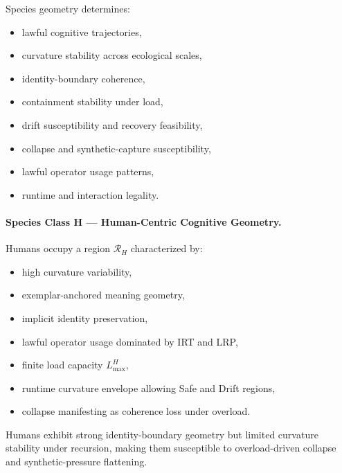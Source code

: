 \medskip

\noindent Species geometry determines:
\begin{itemize}
    \item lawful cognitive trajectories,
    \item curvature stability across ecological scales,
    \item identity-boundary coherence,
    \item containment stability under load,
    \item drift susceptibility and recovery feasibility,
    \item collapse and synthetic-capture susceptibility,
    \item lawful operator usage patterns,
    \item runtime and interaction legality.
\end{itemize}


\paragraph{Species Class H — Human-Centric Cognitive Geometry.}

Humans occupy a region $\mathcal{R}_H$ characterized by:
\begin{itemize}
    \item high curvature variability,
    \item exemplar-anchored meaning geometry,
    \item implicit identity preservation,
    \item lawful operator usage dominated by IRT and LRP,
    \item finite load capacity $L_{\max}^H$,
    \item runtime curvature envelope allowing Safe and Drift regions,
    \item collapse manifesting as coherence loss under overload.
\end{itemize}

Humans exhibit strong identity-boundary geometry but limited curvature
stability under recursion, making them susceptible to overload-driven collapse
and synthetic-pressure flattening.


